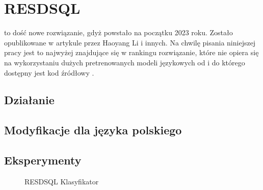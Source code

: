 \section{RESDSQL}
 to dość nowe rozwiązanie, gdyż powstało na początku 2023 roku. Zostało opublikowane w artykule  \cite{Li2023resdsql} przez Haoyang Li i innych. Na chwilę pisania niniejszej pracy jest to najwyżej znajdujące się w rankingu  rozwiązanie, które nie opiera się na wykorzystaniu dużych pretrenowanych modeli językowych od  i do którego dostępny jest kod źródłowy \cite{resdsql-repository}.

\subsection{Działanie}

\subsection{Modyfikacje dla języka polskiego}

\subsection{Eksperymenty}

\begin{figure}[ht!]
  \begin{center}
    \caption{RESDSQL Klasyfikator}
    \label{plot:resdsql-classifier-accuracy}
  \end{center}
\end{figure}

